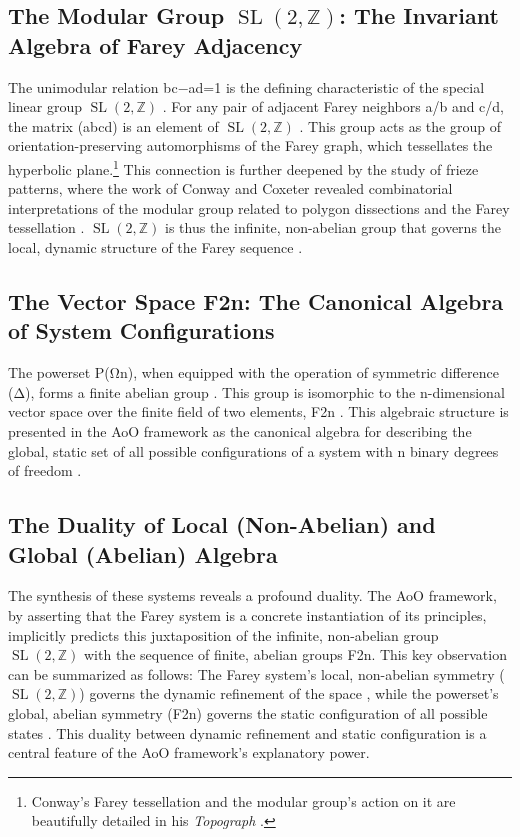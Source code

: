 \documentclass[12pt,a4paper]{article}
\DeclareMathOperator{\SL}{SL}
\theoremstyle{definition}
\theoremstyle{remark}
\begin{document}
\subsection{The Modular Group $\SL(2,\mathbb{Z})$: The Invariant Algebra of Farey Adjacency}
The unimodular relation bc−ad=1 is the defining characteristic of the special linear group $\SL(2,\mathbb{Z})$ \cite{ConradSL2Z, WikipediaSL2Z}. For any pair of adjacent Farey neighbors a/b and c/d, the matrix (ab​cd​) is an element of $\SL(2,\mathbb{Z})$ \cite{Zukin2016, DUMMIT}. This group acts as the group of orientation-preserving automorphisms of the Farey graph, which tessellates the hyperbolic plane.\footnote{Conway's Farey tessellation and the modular group's action on it are beautifully detailed in his \emph{Topograph} \cite{ConwayTopograph1985}.} This connection is further deepened by the study of frieze patterns, where the work of Conway and Coxeter revealed combinatorial interpretations of the modular group related to polygon dissections and the Farey tessellation \cite{ConwayCoxeter1973}. $\SL(2,\mathbb{Z})$ is thus the infinite, non-abelian group that governs the local, dynamic structure of the Farey sequence \cite{ConradSL2Z}.
\subsection{The Vector Space F2n​: The Canonical Algebra of System Configurations}
The powerset P(Ωn​), when equipped with the operation of symmetric difference (Δ), forms a finite abelian group \cite{WikipediaPowerset, BooleanRing}. This group is isomorphic to the n-dimensional vector space over the finite field of two elements, F2n​ \cite{F2nVectorSpace, BooleanRing}. This algebraic structure is presented in the AoO framework as the canonical algebra for describing the global, static set of all possible configurations of a system with n binary degrees of freedom \cite{ElKhettabi2025AoO, ElKhettabi2024HCN}.
\subsection{The Duality of Local (Non-Abelian) and Global (Abelian) Algebra}
The synthesis of these systems reveals a profound duality. The AoO framework, by asserting that the Farey system is a concrete instantiation of its principles, implicitly predicts this juxtaposition of the infinite, non-abelian group $\SL(2,\mathbb{Z})$ with the sequence of finite, abelian groups F2n​. This key observation can be summarized as follows: The Farey system’s local, non-abelian symmetry ($\SL(2,\mathbb{Z})$) governs the dynamic refinement of the space \cite{Zukin2016, ConradSL2Z}, while the powerset’s global, abelian symmetry (F2n​) governs the static configuration of all possible states \cite{WikipediaPowerset, BooleanRing}. This duality between dynamic refinement and static configuration is a central feature of the AoO framework's explanatory power.
\end{document}
